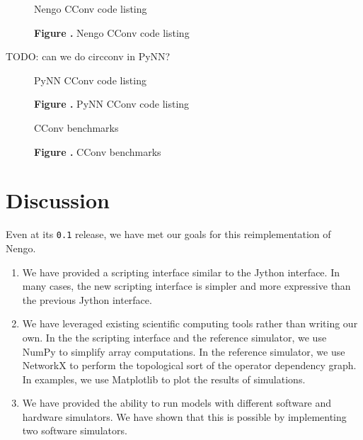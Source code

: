 \documentclass{frontiersSCNS}
\begin{document}
\begin{figure}
\begin{center}
  Nengo CConv code listing
\end{center}
 \textbf{\label{fig:01} Figure .}{
   Nengo CConv code listing}
\end{figure}

TODO: can we do circconv in PyNN?

\begin{figure}
\begin{center}
  PyNN CConv code listing
\end{center}
 \textbf{\label{fig:01} Figure .}{
   PyNN CConv code listing}
\end{figure}

\begin{figure}
\begin{center}
  CConv benchmarks
\end{center}
 \textbf{\label{fig:01} Figure .}{
   CConv benchmarks}
\end{figure}

\section{Discussion}

Even at its \texttt{0.1} release,
we have met our goals
for this reimplementation of Nengo.
\begin{enumerate}
  \item We have provided a scripting interface
    similar to the Jython interface.
    In many cases, the new scripting interface
    is simpler and more expressive than
    the previous Jython interface.
  \item We have leveraged existing scientific computing tools
    rather than writing our own.
    In the the scripting interface and the reference simulator,
    we use NumPy to simplify array computations.
    In the reference simulator, we use
    NetworkX to perform the topological sort
    of the operator dependency graph.
    In examples, we use Matplotlib
    to plot the results of simulations.
  \item We have provided the ability to run models with
    different software and hardware simulators.
    We have shown that this is possible by
    implementing two software simulators.
\end{enumerate}
\end{document}
